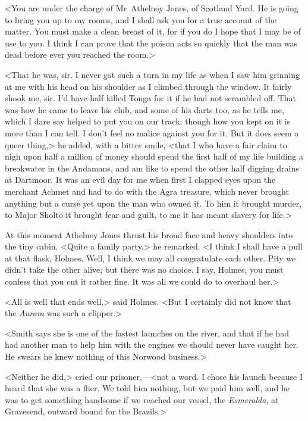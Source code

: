 <You are under the charge of Mr~Athelney Jones, of Scotland Yard. He is going to bring you up to my rooms, and I shall ask you for a true account of the matter. You must make a clean breast of it, for if you do I hope that I may be of use to you. I think I can prove that the poison acts so quickly that the man was dead before ever you reached the room.>

<That he was, sir. I never got such a turn in my life as when I saw him grinning at me with his head on his shoulder as I climbed through the window. It fairly shook me, sir. I'd have half killed Tonga for it if he had not scrambled off. That was how he came to leave his club, and some of his darts too, as he tells me, which I dare say helped to put you on our track; though how you kept on it is more than I can tell. I don't feel no malice against you for it. But it does seem a queer thing,> he added, with a bitter smile, <that I who have a fair claim to nigh upon half a million of money should spend the first half of my life building a breakwater in the Andamans, and am like to spend the other half digging drains at Dartmoor. It was an evil day for me when first I clapped eyes upon the merchant Achmet and had to do with the Agra treasure, which never brought anything but a curse yet upon the man who owned it. To him it brought murder, to Major Sholto it brought fear and guilt, to me it has meant slavery for life.>

At this moment Athelney Jones thrust his broad face and heavy shoulders into the tiny cabin. <Quite a family party,> he remarked. <I think I shall have a pull at that flask, Holmes. Well, I think we may all congratulate each other. Pity we didn't take the other alive; but there was no choice. I say, Holmes, you must confess that you cut it rather fine. It was all we could do to overhaul her.>

<All is well that ends well,> said Holmes. <But I certainly did not know that the \textit{Aurora} was such a clipper.>

<Smith says she is one of the fastest launches on the river, and that if he had had another man to help him with the engines we should never have caught her. He swears he knew nothing of this Norwood business.>

<Neither he did,> cried our prisoner,—<not a word. I chose his launch because I heard that she was a flier. We told him nothing, but we paid him well, and he was to get something handsome if we reached our vessel, the \textit{Esmeralda}, at Gravesend, outward bound for the Brazils.>

